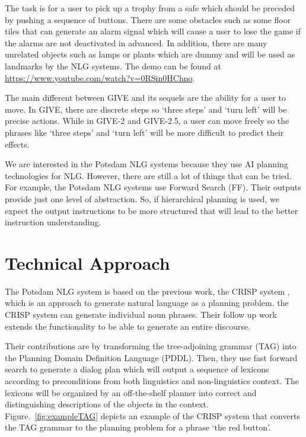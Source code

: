 \documentclass[11pt]{article} %
\begin{document}
The task is for a user to pick up a trophy from a safe which should be preceded by pushing a sequence of buttons. There are some obstacles such as some floor tiles that can generate an alarm signal which will cause a user to lose the game if the alarms are not deactivated in advanced. In addition, there are many unrelated objects such as lamps or plants which are dummy and will be used as landmarks by the NLG systems. The demo can be found at \url{https://www.youtube.com/watch?v=0RSin0HChno}.

The main different between GIVE and its sequels are the ability for a user to move. In GIVE, there are discrete steps so `three steps' and `turn left' will be precise actions. While in GIVE-2 and GIVE-2.5, a user can move freely so the phrases like `three steps' and `turn left' will be more difficult to predict their effects.

We are interested in the Potsdam NLG systems \cite{garoufi2011potsdam} because they use AI planning technologies for NLG. However, there are still a lot of things that can be tried. For example, the Potsdam NLG systems use Forward Search (FF). Their outputs provide just one level of abstraction. So, if hierarchical planning is used, we expect the output instructions to be more structured that will lead to the better instruction understanding.

\section{Technical Approach}

The Potsdam NLG system \cite{garoufi2011combining, garoufi2011potsdam, garoufi2014generation} is based on the previous work, the CRISP system \cite{crisp07}, which is an approach to generate natural language as a planning problem. the CRISP system can generate individual noun phrases. Their follow up work \cite{scrisp-10} extends the functionality to be able to generate an entire discourse.

Their contributions are by transforming the tree-adjoining grammar (TAG) into the Planning Domain Definition Language (PDDL). Then, they use fast forward search \cite{hoffmann:nebel:jair-01} to generate a dialog plan which will output a sequence of lexicons according to preconditions from both linguistics and non-linguistics context. The lexicons will be organized by an off-the-shelf planner into correct and distinguishing descriptions of the objects in the context. Figure.~\ref{fig:exampleTAG} depicts an example of the CRISP system that converts the TAG grammar to the planning problem for a phrase `the red button'.
\end{document}
